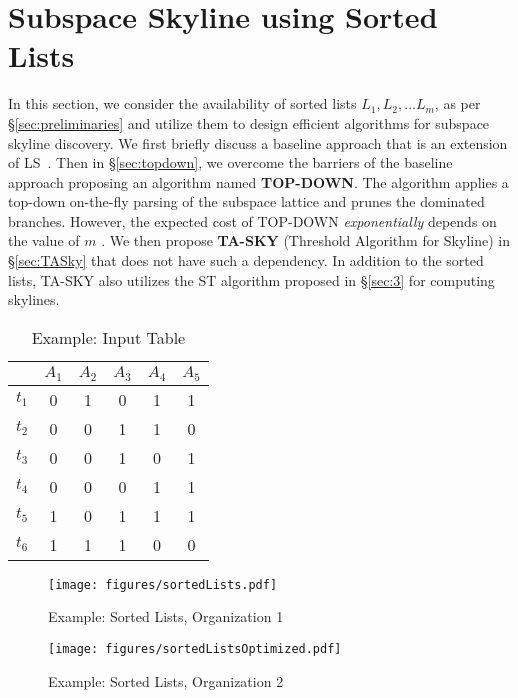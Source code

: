 \section{Subspace Skyline using Sorted \\ Lists} \label{sec:subsky}

In this section, we consider the availability of sorted lists $L_1, L_2, \ldots L_m$, as per \S\ref{sec:preliminaries} and utilize them to design efficient algorithms for subspace skyline discovery.
We first briefly discuss a baseline approach that is an extension of LS~\cite{morse2007efficient}.
Then in \S\ref{sec:topdown}, we overcome the barriers of the baseline approach proposing an algorithm named {\bf TOP-DOWN}. The algorithm applies a top-down on-the-fly parsing of the subspace lattice and prunes the dominated branches.
However, the expected cost of TOP-DOWN {\em exponentially} depends on the value of $m$ \cite{TechReport}.
We then propose {\bf TA-SKY} (Threshold Algorithm for Skyline) in \S\ref{sec:TASky} that does not have such a dependency. In addition to the sorted lists, TA-SKY also utilizes the ST algorithm proposed in \S\ref{sec:3} for computing skylines.

\begin{table}[!t]
\centering
\caption{Example: Input Table}\label{tab:runningExampleSubspaceSkyline}
\begin{tiny}
\begin{tabular}{cccccc}
    \hline 
     & $A_1$ & $A_2$ & $A_3$ & $A_4$ & $A_5$ \\
    \hline 
    $t_1$ & 0 & 1 & 0 & 1 & 1\\
    \hline
    $t_2$ & 0 & 0 & 1 & 1 & 0\\
    \hline
    $t_3$ & 0 & 0 & 1 & 0 & 1\\
    \hline
    $t_4$ & 0 & 0 & 0 & 1 & 1\\
    \hline
    $t_5$ & 1 & 0 & 1 & 1 & 1\\
    \hline
    $t_6$ & 1 & 1 & 1 & 0 & 0\\
    \hline
\end{tabular}
\end{tiny}
\end{table}





\begin{figure}[!ht]
  \begin{minipage}[t]{0.48\linewidth}
    \centering
    \texttt{[image: figures/sortedLists.pdf]}
    \caption{Example: Sorted Lists, Organization 1} 
    \label{fig:sortedLists}
  \end{minipage}
  \hspace{1mm}
  \begin{minipage}[t]{0.48\linewidth}
    \centering
    \texttt{[image: figures/sortedListsOptimized.pdf]}
    \caption{Example: Sorted Lists, Organization 2}
    \label{fig:sortedListsOptimized}
  \end{minipage}
\end{figure}

